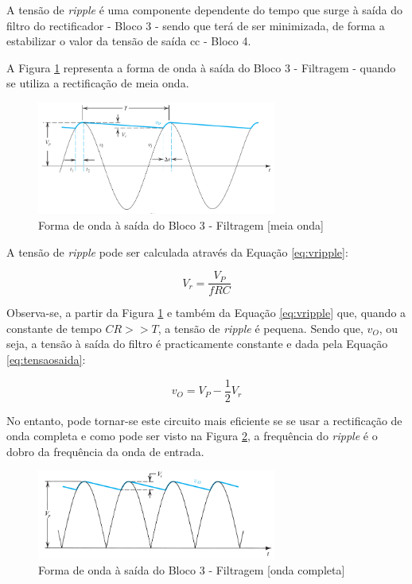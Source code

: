 A tensão de \textit{ripple} é uma componente dependente do tempo que surge à saída do filtro do rectificador - Bloco 3 - sendo que terá de ser minimizada, de forma a estabilizar o valor da tensão de saída \acrshort{cc} - Bloco 4. \cite{sedrasmith} 

A Figura \ref{fig:sedraripple} representa a forma de onda à saída do Bloco 3 - Filtragem - quando se utiliza a rectificação de meia onda.
\begin{figure}[hbtp]
	\centering
	\includegraphics[width=0.7\textwidth]{figures/sedra_ripple.png}
	\caption{Forma de onda à saída do Bloco 3 - Filtragem [meia onda] \cite{sedrasmith}}
	\label{fig:sedraripple}
\end{figure}

A tensão de \textit{ripple} pode ser calculada através da Equação \ref{eq:vripple}:

\begin{equation} \label{eq:vripple}
	V_{r} = \frac{V_{P}}{fRC}
\end{equation}

Observa-se, a partir da Figura \ref{fig:sedraripple} e também da Equação \ref{eq:vripple} que, quando a constante de tempo $CR >> T$, a tensão de \textit{ripple} é pequena. Sendo que, $v_{O}$, ou seja, a tensão à saída do filtro é practicamente constante e dada pela Equação \ref{eq:tensaosaida}:

\begin{equation} \label{eq:tensaosaida}
	v_{O} = V_{P} - \dfrac{1}{2}V_{r}	
\end{equation}

No entanto, pode tornar-se este circuito mais eficiente se se usar a rectificação de onda completa e como pode ser visto na Figura \ref{fig:sedraripplecompleta}, a frequência do \textit{ripple} é o dobro da frequência da onda de entrada.

\begin{figure}[hbtp]
	\centering
	\includegraphics[width=0.7\textwidth]{figures/sedra_ripple_OC.png}
	\caption{Forma de onda à saída do Bloco 3 - Filtragem [onda completa] \cite{sedrasmith}}
	\label{fig:sedraripplecompleta}
\end{figure}

